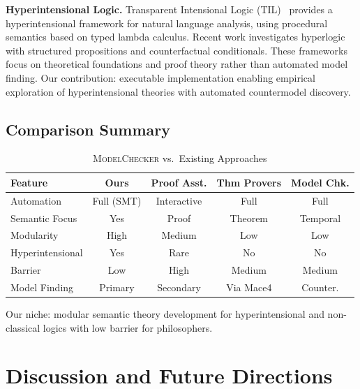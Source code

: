 \documentclass[pdflatex,sn-mathphys-num]{sn-jnl}
\newcommand{\modelchecker}{\textsc{ModelChecker}}
\theoremstyle{thmstyleone}
\theoremstyle{thmstyletwo}
\theoremstyle{thmstylethree}
\begin{document}
\textbf{Hyperintensional Logic.}
Transparent Intensional Logic (TIL)~\cite{til2010} provides a hyperintensional framework for natural language analysis, using procedural semantics based on typed lambda calculus.
Recent work investigates hyperlogic with structured propositions and counterfactual conditionals.
These frameworks focus on theoretical foundations and proof theory rather than automated model finding.
Our contribution: executable implementation enabling empirical exploration of hyperintensional theories with automated countermodel discovery.

\subsection{Comparison Summary}\label{sec:comparison-summary}

\begin{table}[htbp]
\centering
\caption{\modelchecker{} vs.\ Existing Approaches}
\label{tab:comparison-tools}
\small
\begin{tabular}{@{}lcccc@{}}
\toprule
\textbf{Feature} & \textbf{Ours} & \textbf{Proof Asst.} & \textbf{Thm Provers} & \textbf{Model Chk.} \\
\midrule
Automation & Full (SMT) & Interactive & Full & Full \\
Semantic Focus & Yes & Proof & Theorem & Temporal \\
Modularity & High & Medium & Low & Low \\
Hyperintensional & Yes & Rare & No & No \\
Barrier & Low & High & Medium & Medium \\
Model Finding & Primary & Secondary & Via Mace4 & Counter. \\
\bottomrule
\end{tabular}
\end{table}

Our niche: modular semantic theory development for hyperintensional and non-classical logics with low barrier for philosophers.


\section{Discussion and Future Directions}\label{sec:discussion}
\end{document}
